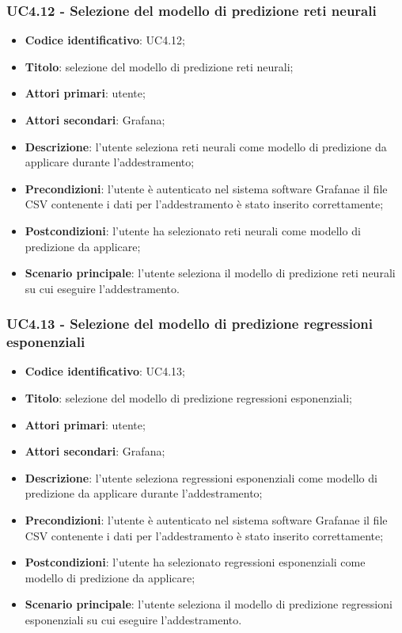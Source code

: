 \subsubsection{UC4.12 - Selezione del modello di predizione reti neurali}
\begin{itemize}
	\item \textbf{Codice identificativo}: UC4.12;
	\item \textbf{Titolo}: selezione del modello di predizione reti neurali;
	\item \textbf{Attori primari}: utente;
	\item \textbf{Attori secondari}: Grafana\glo;
	\item \textbf{Descrizione}: l'utente seleziona reti neurali come modello di predizione da applicare durante l'addestramento;
	\item \textbf{Precondizioni}: l'utente è autenticato nel sistema software Grafana\glosp e il file CSV contenente i dati per l'addestramento è stato inserito correttamente;
	\item \textbf{Postcondizioni}: l'utente ha selezionato reti neurali come modello di predizione da applicare;
	\item \textbf{Scenario principale}: l'utente seleziona il modello di predizione reti neurali su cui eseguire l'addestramento.
\end{itemize}
\subsubsection{UC4.13 - Selezione del modello di predizione regressioni esponenziali}
\begin{itemize}
	\item \textbf{Codice identificativo}: UC4.13;
	\item \textbf{Titolo}: selezione del modello di predizione regressioni esponenziali;
	\item \textbf{Attori primari}: utente;
	\item \textbf{Attori secondari}: Grafana\glo;
	\item \textbf{Descrizione}: l'utente seleziona regressioni esponenziali come modello di predizione da applicare durante l'addestramento;
	\item \textbf{Precondizioni}: l'utente è autenticato nel sistema software Grafana\glosp e il file CSV contenente i dati per l'addestramento è stato inserito correttamente;
	\item \textbf{Postcondizioni}: l'utente ha selezionato regressioni esponenziali come modello di predizione da applicare;
	\item \textbf{Scenario principale}: l'utente seleziona il modello di predizione regressioni esponenziali su cui eseguire l'addestramento.
\end{itemize}
